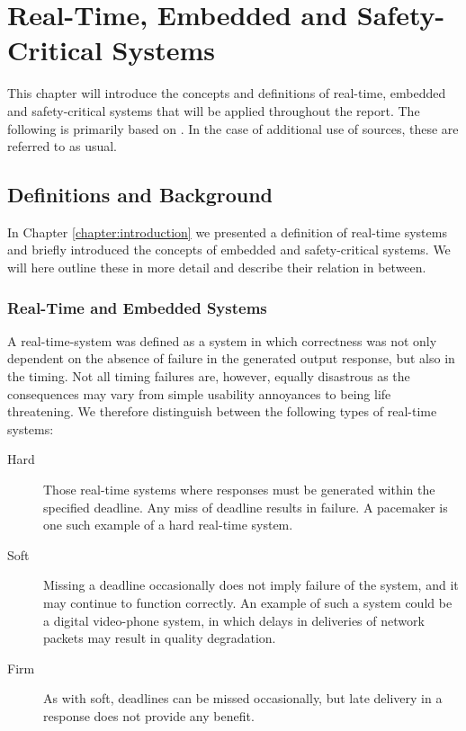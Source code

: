 \chapter{Real-Time, Embedded and Safety-Critical Systems}
\label{chapter:rts}
This chapter will introduce the concepts and definitions of real-time, embedded and safety-critical systems that will be applied throughout the report. The following is primarily based on \cite{alan2001real}. In the case of additional use of sources, these are referred to as usual.

\section{Definitions and Background} %
\label{sec:definitions_and_background}
In Chapter \ref{chapter:introduction} we presented a definition of real-time systems and briefly introduced the concepts of embedded and safety-critical systems. We will here outline these in more detail and describe their relation in between.

\subsection{Real-Time and Embedded Systems} %
\label{sub:real_time_and_embedded_systems}
A real-time-system was defined as a system in which correctness was not only dependent on the absence of failure in the generated output response, but also in the timing. Not all timing failures are, however, equally disastrous as the consequences may vary from simple usability annoyances to being life threatening. We therefore distinguish between the following types of real-time systems:
\begin{description}
\item[Hard] Those real-time systems where responses must be generated within the specified deadline. Any miss of deadline results in failure. A pacemaker is one such example of a hard real-time system.
\item[Soft] Missing a deadline occasionally does not imply failure of the system, and it may continue to function correctly. An example of such a system could be a digital video-phone system, in which delays in deliveries of network packets may result in quality degradation.
\item[Firm] As with soft, deadlines can be missed occasionally, but late delivery in a response does not provide any benefit. 
\end{description}

